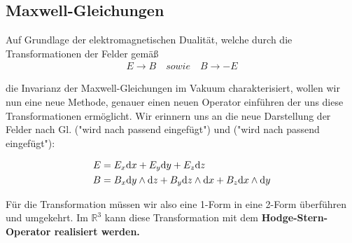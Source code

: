 \subsection{Maxwell-Gleichungen}


Auf Grundlage der elektromagnetischen Dualität, welche durch die Transformationen der Felder gemäß
\begin{align*}
E \rightarrow B \quad sowie \quad B \rightarrow -E
\end{align*}

die Invarianz der Maxwell-Gleichungen im Vakuum charakterisiert, wollen wir nun eine neue Methode, genauer einen neuen Operator einführen der uns diese Transformationen ermöglicht. Wir erinnern uns an die neue Darstellung der Felder nach Gl. ("wird nach passend eingefügt") und ("wird nach passend eingefügt"):

\begin{align*}
E &= E_x \dd x +E_y \dd y + E_z \dd z   \\
B &= B_x \dd y \wedge \dd z + B_y \dd z \wedge \dd x + B_z \dd x \wedge \dd y 
\end{align*}

Für die Transformation müssen wir also eine 1-Form in eine 2-Form überführen und umgekehrt. Im $\mathbb{R}^3$ kann diese Transformation mit dem \bfseries Hodge-Stern-Operator \normalfont realisiert werden.